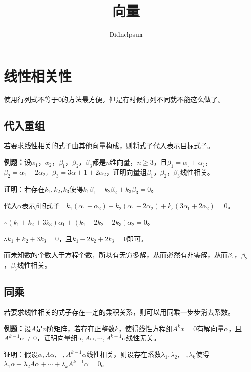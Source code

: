\documentclass[UTF8, 12pt]{ctexart}
\author{Didnelpsun}
\title{向量}
\date{}
\begin{document}
\maketitle
\pagestyle{empty}
\thispagestyle{empty}
\tableofcontents
\thispagestyle{empty}
\newpage
\pagestyle{plain}
\setcounter{page}{1}

\section{线性相关性}

使用行列式不等于$0$的方法最方便，但是有时候行列不同就不能这么做了。

\subsection{代入重组}

若要求线性相关的式子由其他向量构成，则将式子代入表示目标式子。

\textbf{例题：}设$\alpha_1$，$\alpha_2$，$\beta_1$，$\beta_2$，$\beta_3$都是$n$维向量，$n\geqslant3$，且$\beta_1=\alpha_1+\alpha_2$，$\beta_2=\alpha_1-2\alpha_2$，$\beta_3=3\alpha+1+2\alpha_2$，证明向量组$\beta_1$，$\beta_2$，$\beta_3$线性相关。

证明：若存在$k_1,k_2,k_3$使得$k_1\beta_1+k_2\beta_2+k_3\beta_3=0$。

代入$\alpha$表示$\beta$的式子：$k_1(\alpha_1+\alpha_2)+k_2(\alpha_1-2\alpha_2)+k_3(3\alpha_1+2\alpha_2)=0$。

$\therefore(k_1+k_2+3k_3)\alpha_1+(k_1-2k_2+2k_3)\alpha_2=0$。

$\therefore k_1+k_2+3k_3=0$，且$k_1-2k_2+2k_3=0$即可。

而未知数的个数大于方程个数，所以有无穷多解，从而必然有非零解，从而$\beta_1$，$\beta_2$，$\beta_3$线性相关。

\subsection{同乘}

若要求线性相关的式子存在一定的乘积关系，则可以用同乘一步步消去系数。

\textbf{例题：}设$A$是$n$阶矩阵，若存在正整数$k$，使得线性方程组$A^kx=0$有解向量$\alpha$，且$A^{k-1}\alpha\neq0$，证明向量组$\alpha,A\alpha,\cdots,A^{k-1}\alpha$线性无关。

证明：假设$\alpha,A\alpha,\cdots,A^{k-1}\alpha$线性相关，则设存在系数$\lambda_1,\lambda_2,\cdots,\lambda_k$使得$\lambda_1\alpha+\lambda_2A\alpha+\cdots+\lambda_kA^{k-1}\alpha=0$。
\end{document}
